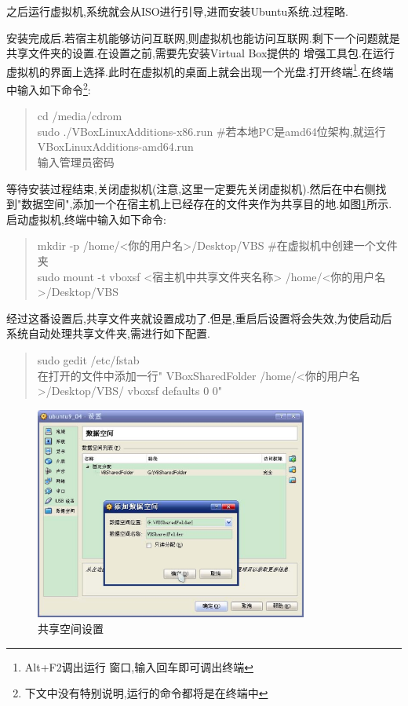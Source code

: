 \documentclass[12pt,a4paper,titlepage]{article}
\begin{document}
之后运行虚拟机,系统就会从ISO进行引导,进而安装Ubuntu系统.过程略.

安装完成后.若宿主机能够访问互联网,则虚拟机也能访问互联网.剩下一个问题就是共享文件夹的设置.在设置之前,需要先安装Virtual Box提供的
增强工具包.在运行虚拟机的界面上选择.此时在虚拟机的桌面上就会出现一个光盘.打开终端\footnote{Alt+F2调出运行
窗口,输入回车即可调出终端}.在终端中输入如下命令\footnote{下文中没有特别说明,运行的命令都将是在终端中}:
\begin{verse}
cd /media/cdrom\\sudo ./VBoxLinuxAdditions-x86.run \#若本地PC是amd64位架构,就运行VBoxLinuxAdditions-amd64.run\\输入管理员密码
\end{verse}
等待安装过程结束,关闭虚拟机{(注意,这里一定要先关闭虚拟机)}.然后在中右侧找到"数据空间",添加一个在宿主机上已经存在的文件夹作为共享目的地.如图\ref{f_sf}所示.
启动虚拟机,终端中输入如下命令:
\begin{verse}
mkdir -p /home/<你的用户名>/Desktop/VBS \#在虚拟机中创建一个文件夹\\sudo mount -t vboxsf <宿主机中共享文件夹名称> 
/home/<你的用户名>/Desktop/VBS
\end{verse}
经过这番设置后,共享文件夹就设置成功了.但是,重启后设置将会失效,为使启动后系统自动处理共享文件夹,需进行如下配置.
\begin{verse}\label{cmd0}
sudo gedit /etc/fstab\\在打开的文件中添加一行" VBoxSharedFolder  /home/<你的用户名>/Desktop/VBS/  vboxsf  defaults 0 0"
\end{verse}
\begin{figure}[!bthp]
\centering
\includegraphics[width=0.8\textwidth,scale=0.8]{pic/f_vb_setting_sf.eps}
\caption{共享空间设置\label{f_sf}}
\end{figure}
\end{document}
